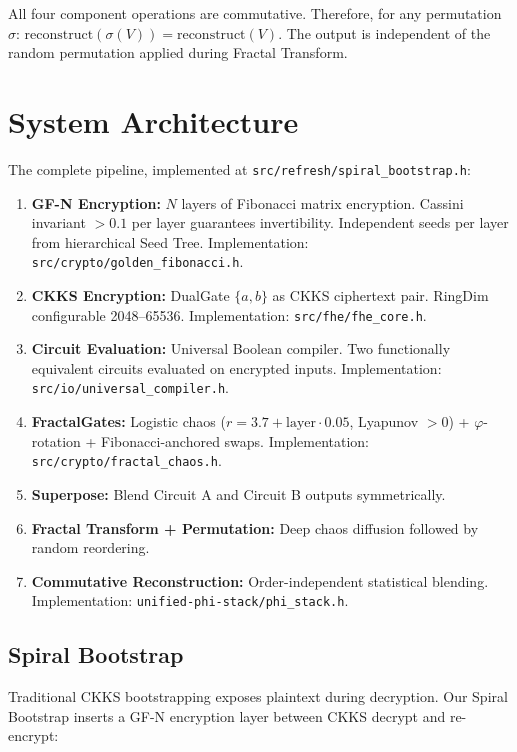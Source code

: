\documentclass[11pt,a4paper]{article}
\begin{document}
All four component operations are commutative. Therefore, for any permutation $\sigma$: $\text{reconstruct}(\sigma(V)) = \text{reconstruct}(V)$. The output is independent of the random permutation applied during Fractal Transform.

\section{System Architecture}

The complete pipeline, implemented at \texttt{src/refresh/spiral\_bootstrap.h}:

\begin{enumerate}
\item \textbf{GF-N Encryption:} $N$ layers of Fibonacci matrix encryption. Cassini invariant $> 0.1$ per layer guarantees invertibility. Independent seeds per layer from hierarchical Seed Tree. Implementation: \texttt{src/crypto/golden\_fibonacci.h}.
\item \textbf{CKKS Encryption:} DualGate $\{a, b\}$ as CKKS ciphertext pair. RingDim configurable 2048--65536. Implementation: \texttt{src/fhe/fhe\_core.h}.
\item \textbf{Circuit Evaluation:} Universal Boolean compiler. Two functionally equivalent circuits evaluated on encrypted inputs. Implementation: \texttt{src/io/universal\_compiler.h}.
\item \textbf{FractalGates:} Logistic chaos ($r = 3.7 + \text{layer} \cdot 0.05$, Lyapunov $> 0$) + $\varphi$-rotation + Fibonacci-anchored swaps. Implementation: \texttt{src/crypto/fractal\_chaos.h}.
\item \textbf{Superpose:} Blend Circuit A and Circuit B outputs symmetrically.
\item \textbf{Fractal Transform + Permutation:} Deep chaos diffusion followed by random reordering.
\item \textbf{Commutative Reconstruction:} Order-independent statistical blending. Implementation: \texttt{unified-phi-stack/phi\_stack.h}.
\end{enumerate}

\subsection{Spiral Bootstrap}

Traditional CKKS bootstrapping exposes plaintext during decryption. Our Spiral Bootstrap inserts a GF-N encryption layer between CKKS decrypt and re-encrypt:
\end{document}
